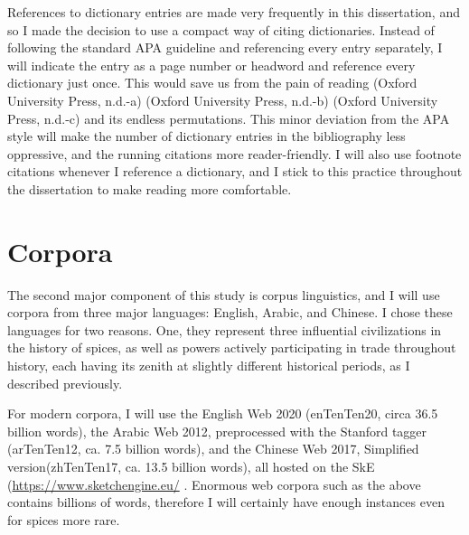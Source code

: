 








\begin{note}
    References to dictionary entries are made very frequently in this dissertation, and so I made the decision to use a compact way of citing dictionaries. Instead of following the standard APA  guideline and referencing every entry separately, I will indicate the entry as a page number or headword and reference every dictionary just once. This would save us from the pain of reading (Oxford University Press, n.d.-a) (Oxford University Press, n.d.-b) (Oxford University Press, n.d.-c) and its endless permutations. This minor deviation from the APA style will make the number of dictionary entries in the bibliography less oppressive, and the running citations more reader-friendly. I will also use footnote citations whenever I reference a dictionary, and I stick to this practice throughout the dissertation to make reading more comfortable.
\end{note}

\section{Corpora}

The second major component of this study is corpus linguistics, and I will use corpora from three major languages: English, Arabic, and Chinese. I chose these languages for two reasons. One, they represent three influential civilizations in the history of spices, as well as powers actively participating in trade throughout history, each having its zenith at slightly different historical periods, as I described previously. 

For modern corpora, I will use the English Web 2020 (enTenTen20, circa 36.5 billion words), the Arabic Web 2012, preprocessed with the Stanford tagger (arTenTen12, ca. 7.5 billion words), and the Chinese Web 2017, Simplified version(zhTenTen17, ca. 13.5 billion words), all hosted on the \gls{SkE} (\url{https://www.sketchengine.eu/} \autocite{kilgarriff_sketch_2004,kilgarriff_sketch_2014}. Enormous web corpora such as the above contains billions of words, therefore I will certainly have enough instances even for spices more rare.

